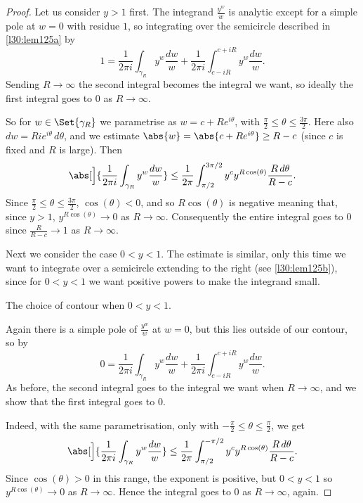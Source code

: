 \begin{proof}
	Let us consider $y > 1$ first.
	The integrand $\frac{y^w}{w}$ is analytic except for a simple pole at $w = 0$ with residue $1$, so integrating over the semicircle described in \autoref{l30:lem125a} by 
	\[
		1 = \frac{1}{2 \pi i} \int_{\gamma_R} y^w \frac{d w}{w} + \frac{1}{2 \pi i} \int_{c - i R}^{c + i R} y^w \frac{d w}{w}.
	\]
	Sending $R \to \infty$ the second integral becomes the integral we want, so ideally the first integral goes to $0$ as $R \to \infty$.

	So for $w \in \Set{\gamma_R}$ we parametrise as $w = c + R e^{i \theta}$, with $\frac{\pi}{2} \leq \theta \leq \frac{3 \pi}{2}$.
	Here also $d w = R i e^{i \theta} \, d \theta$, and we estimate $\abs{w} = \abs{c + R e^{i \theta}} \geq R - c$ (since $c$ is fixed and $R$ is large).
	Then
	\[
		\abs[\Big]{\frac{1}{2 \pi i} \int_{\gamma_R} y^w \frac{d w}{w}} \leq \frac{1}{2 \pi} \int_{\pi/2}^{3 \pi/2} y^c y^{R \cos(\theta)} \frac{R \, d \theta}{R - c}.
	\]
	Since $\frac{\pi}{2} \leq \theta \leq \frac{3 \pi}{2}$, $\cos(\theta) < 0$, and so $R \cos(\theta)$ is negative meaning that, since $y > 1$, $y^{R \cos(\theta)} \to 0$ as $R \to \infty$.
	Consequently the entire integral goes to $0$ since $\frac{R}{R - c} \to 1$ as $R \to \infty$.

	Next we consider the case $0 < y < 1$.
	The estimate is similar, only this time we want to integrate over a semicircle extending to the right (see \autoref{l30:lem125b}), since for $0 < y < 1$ we want positive powers to make the integrand small.

	\begin{marginfigure}

		\caption{\label{l30:lem125b} The choice of contour when $0 < y < 1$.}
	\end{marginfigure}

	Again there is a simple pole of $\frac{y^w}{w}$ at $w = 0$, but this lies outside of our contour, so by 
	\[
		0 = \frac{1}{2 \pi i} \int_{\gamma_R} y^w \frac{d w}{w} + \frac{1}{2 \pi i} \int_{c - i R}^{c + i R} y^w \frac{d w}{w}.
	\]
	As before, the second integral goes to the integral we want when $R \to \infty$, and we show that the first integral goes to $0$.

	Indeed, with the same parametrisation, only with $-\frac{\pi}{2} \leq \theta \leq \frac{\pi}{2}$, we get
	\[
		\abs[\Big]{\frac{1}{2 \pi i} \int_{\gamma_R} y^w \frac{d w}{w}} \leq \frac{1}{2 \pi} \int_{\pi/2}^{-\pi/2} y^c y^{R \cos(\theta)} \frac{R \, d \theta}{R - c}.
	\]
	Since $\cos(\theta) > 0$ in this range, the exponent is positive, but $0 < y < 1$ so $y^{R \cos(\theta)} \to 0$ as $R \to \infty$.
	Hence the integral goes to $0$ as $R \to \infty$, again.
\end{proof}

